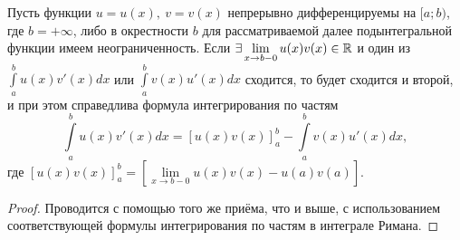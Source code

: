 \documentclass[../../main.tex]{subfiles}
\begin{document}
\begin{thm}
	Пусть функции $u = u(x),\ v = v(x)$ непрерывно дифференцируемы на  $[a; b)$,
	где $ b = +\infty $, либо в окрестности $ b $ для рассматриваемой далее
	подынтегральной функции имеем неограниченность. Если
	$\exists \lim\limits_{x \to b - 0} u(x)v(x) \in \mathbb{R}$ и один из
	$\int\limits_a^bu(x)v'(x)dx$ или $ \int\limits_a^bv(x)u'(x)dx$
	сходится, то будет сходится и второй, и при этом справедлива 
	формула интегрирования по частям
	\begin{equation}
		\label{lec9:3}
		\int\limits_a^b u(x)v'(x) dx = \left[
		u(x)v(x)\right]_a^b - 
		\int\limits_a^b v(x)u'(x) dx,
	\end{equation}
	где $ \left[u(x)v(x)\right]_a^b = \left[
	\lim\limits_{x \to b - 0} u(x)v(x) -
	u(a)v(a) \right]$.
\end{thm}
\begin{proof}
	Проводится с помощью того же приёма, что и выше, с использованием 
	соответствующей формулы интегрирования по частям в интеграле Римана.
\end{proof}
\end{document}

